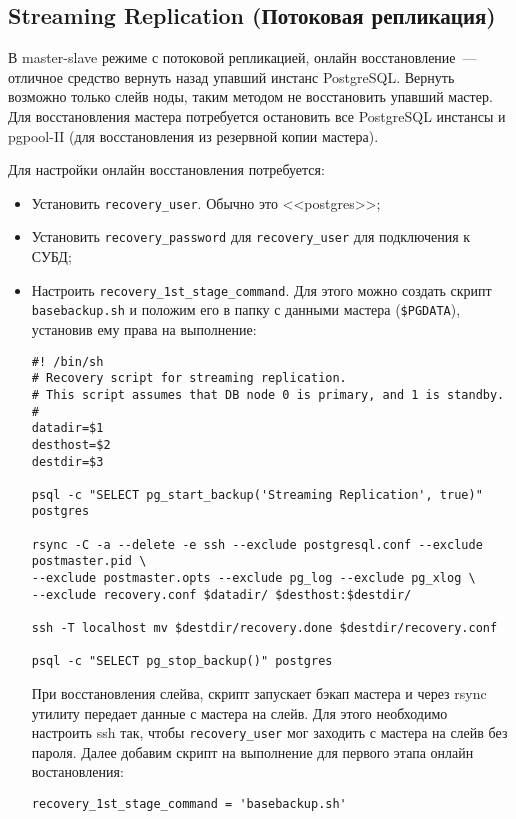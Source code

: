 \subsection{Streaming Replication (Потоковая репликация)}

В master-slave режиме с потоковой репликацией, онлайн восстановление~--- отличное средство вернуть назад упавший инстанс PostgreSQL. Вернуть возможно только слейв ноды, таким методом не восстановить упавший мастер. Для восстановления мастера потребуется остановить все PostgreSQL инстансы и pgpool-II (для восстановления из резервной копии мастера).

Для настройки онлайн восстановления потребуется:

\begin{itemize}
  \item Установить \lstinline!recovery_user!. Обычно это <<postgres>>;
  \item Установить \lstinline!recovery_password! для \lstinline!recovery_user! для подключения к СУБД;
  \item Настроить \lstinline!recovery_1st_stage_command!. Для этого можно создать скрипт \lstinline!basebackup.sh! и положим его в папку с данными мастера (\lstinline!$PGDATA!), установив ему права на выполнение:

\begin{lstlisting}[label=lst:pgpool44,caption=basebackup.sh]
#! /bin/sh
# Recovery script for streaming replication.
# This script assumes that DB node 0 is primary, and 1 is standby.
#
datadir=$1
desthost=$2
destdir=$3

psql -c "SELECT pg_start_backup('Streaming Replication', true)" postgres

rsync -C -a --delete -e ssh --exclude postgresql.conf --exclude postmaster.pid \
--exclude postmaster.opts --exclude pg_log --exclude pg_xlog \
--exclude recovery.conf $datadir/ $desthost:$destdir/

ssh -T localhost mv $destdir/recovery.done $destdir/recovery.conf

psql -c "SELECT pg_stop_backup()" postgres
\end{lstlisting}

При восстановления слейва, скрипт запускает бэкап мастера и через rsync утилиту передает данные с мастера на слейв. Для этого необходимо настроить ssh так, чтобы \lstinline!recovery_user! мог заходить с мастера на слейв без пароля. Далее добавим скрипт на выполнение для первого этапа онлайн востановления:

\begin{lstlisting}[label=lst:pgpool45,caption=recovery\_1st\_stage\_command]
recovery_1st_stage_command = 'basebackup.sh'
\end{lstlisting}


\end{itemize}
